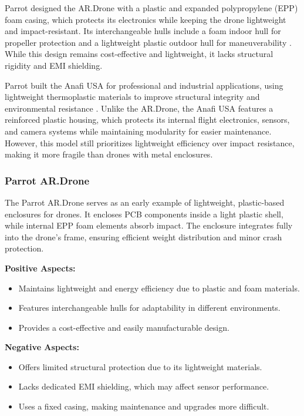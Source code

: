 \documentclass[12pt]{article}
\begin{document}
Parrot designed the AR.Drone with a plastic and expanded polypropylene (EPP) foam casing, which protects its electronics while keeping the drone lightweight and impact-resistant. Its interchangeable hulls include a foam indoor hull for propeller protection and a lightweight plastic outdoor hull for maneuverability \cite{parrot1}. While this design remains cost-effective and lightweight, it lacks structural rigidity and EMI shielding.

Parrot built the Anafi USA for professional and industrial applications, using lightweight thermoplastic materials to improve structural integrity and environmental resistance \cite{parrot2}. Unlike the AR.Drone, the Anafi USA features a reinforced plastic housing, which protects its internal flight electronics, sensors, and camera systems while maintaining modularity for easier maintenance. However, this model still prioritizes lightweight efficiency over impact resistance, making it more fragile than drones with metal enclosures.

\subsubsection{Parrot AR.Drone}

The Parrot AR.Drone serves as an early example of lightweight, plastic-based enclosures for drones. It encloses PCB components inside a light plastic shell, while internal EPP foam elements absorb impact. The enclosure integrates fully into the drone’s frame, ensuring efficient weight distribution and minor crash protection.

\textbf{Positive Aspects:}
\begin{itemize}
    \item Maintains lightweight and energy efficiency due to plastic and foam materials.
    \item Features interchangeable hulls for adaptability in different environments.
    \item Provides a cost-effective and easily manufacturable design.
\end{itemize}

\textbf{Negative Aspects:}
\begin{itemize}
    \item Offers limited structural protection due to its lightweight materials.
    \item Lacks dedicated EMI shielding, which may affect sensor performance.
    \item Uses a fixed casing, making maintenance and upgrades more difficult.
\end{itemize}
\end{document}
